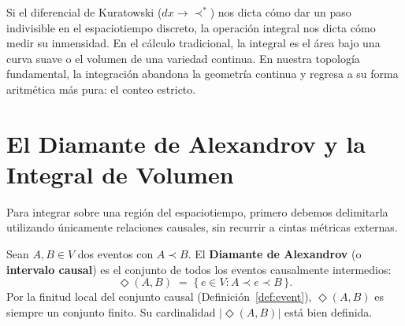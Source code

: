 \documentclass[11pt, a4paper, openany]{book}
\newcommand{\covers}{\prec^{\!*}}
\newcommand{\diam}[2]{\Diamond(#1,#2)}
\begin{document}
Si el diferencial de Kuratowski ($dx \to \covers$) nos dicta c\'omo
dar un paso indivisible en el espaciotiempo discreto, la operaci\'on
integral nos dicta c\'omo medir su inmensidad. En el c\'alculo
tradicional, la integral es el \'area bajo una curva suave o el volumen
de una variedad continua. En nuestra topolog\'ia fundamental, la
integraci\'on abandona la geometr\'ia continua y regresa a su forma
aritm\'etica m\'as pura: el conteo estricto.

\section{El Diamante de Alexandrov y la Integral de Volumen}

Para integrar sobre una regi\'on del espaciotiempo, primero debemos
delimitarla utilizando \'unicamente relaciones causales, sin recurrir
a cintas m\'etricas externas.

\begin{definition}
\label{def:alexandrov}
Sean $A, B \in V$ dos eventos con $A \prec B$. El \textbf{Diamante de
Alexandrov} (o \textbf{intervalo causal}) es el conjunto de todos los
eventos causalmente intermedios:
\begin{equation}
  \diam{A}{B} \;=\; \bigl\{\, e \in V : A \prec e \prec B \,\bigr\}.
  \label{eq:alexandrov}
\end{equation}
Por la finitud local del conjunto causal
(Definici\'on~\ref{def:event}), $\diam{A}{B}$ es siempre un conjunto
finito. Su cardinalidad $|\diam{A}{B}|$ est\'a bien definida.
\end{definition}
\end{document}
